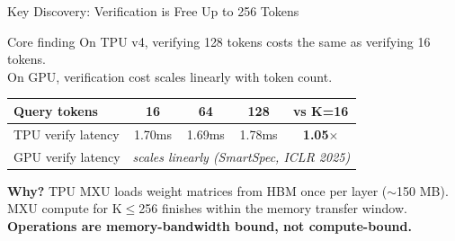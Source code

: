 \documentclass[10pt]{beamer}
\begin{document}
\begin{frame}{Key Discovery: Verification is Free Up to 256 Tokens}
\begin{alertblock}{Core finding}
On TPU v4, verifying 128 tokens costs the same as verifying 16 tokens.\\
On GPU, verification cost scales linearly with token count.
\end{alertblock}

\centering
\footnotesize
\begin{tabular}{l cccc}
\toprule
\textbf{Query tokens} & \textbf{16} & \textbf{64} & \textbf{128} & \textbf{vs K=16} \\
\midrule
\rowcolor{rowgreen}
TPU verify latency & 1.70ms & 1.69ms & 1.78ms & \textbf{1.05$\times$} \\
\rowcolor{rowred}
GPU verify latency & \multicolumn{4}{c}{\textit{scales linearly (SmartSpec, ICLR 2025)}} \\
\bottomrule
\end{tabular}

\vspace{0.8em}
\textbf{Why?} TPU MXU loads weight matrices from HBM once per layer ($\sim$150 MB).\\
MXU compute for K$\leq$256 finishes within the memory transfer window.\\
\textbf{Operations are memory-bandwidth bound, not compute-bound.}
\end{frame}
\end{document}
